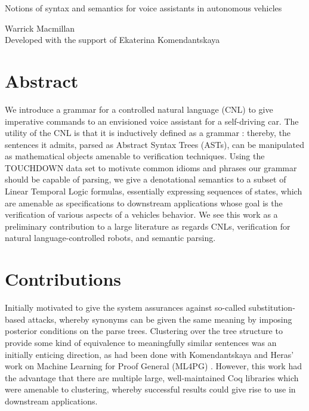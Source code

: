\documentclass[a4paper, 11pt]{article}
\begin{document}

\begin{titlepage}

\vspace*{1cm}

\begin{center} \Large Notions of syntax and semantics
  for voice assistants in autonomous vehicles  \\ 


\vspace{1.5cm}

\large Warrick Macmillan  \\
\large Developed with the support of Ekaterina Komendantskaya
\end{center}


\end{titlepage}

\section{Abstract} 

We introduce a grammar for a controlled natural language (CNL) to give
imperative commands to an envisioned voice assistant for a self-driving car. The
utility of the CNL is that it is inductively defined as a grammar : thereby, the
sentences it admits, parsed as Abstract Syntax Trees (ASTs), can be manipulated as
mathematical objects amenable to verification techniques. Using the TOUCHDOWN
data set to motivate common idioms and phrases our grammar should be capable of
parsing, we give a denotational semantics to a subset of Linear Temporal Logic
formulas, essentially expressing sequences of states, which are 
amenable as specifications to downstream applications whose goal is the
verification of various aspects of a vehicles behavior. We see this work 
as a preliminary contribution to a large literature as regards CNLs,
verification for natural language-controlled robots, and semantic parsing.

\section{Contributions}

Initially motivated to give the system assurances against so-called
substitution-based attacks, whereby synonyms can be given the same meaning by
imposing posterior conditions on the parse trees. Clustering over the tree
structure to provide some kind of equivalence to meaningfully similar sentences
was an initially enticing direction, as had been done with Komendantskaya and
Heras' work on Machine Learning for Proof General (ML4PG) \cite{ml4pg}. However,
this work had the advantage that there are multiple large, well-maintained Coq
libraries which were amenable to clustering, whereby successful results could
give rise to use in downstream applications.
\end{document}
